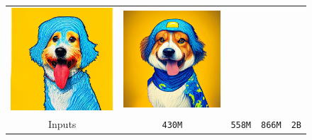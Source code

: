 \begin{figure}[!ht]
\begin{tabular}[t]{c c c c c}
    \includegraphics[width=\xwidth]{cp2/figures/dreambooth/dog/c320_checkpoint_99.png} &
    \includegraphics[width=\xwidth]{cp2/figures/dreambooth/dog/c512_checkpoint_99.png} \\
    Inputs &  \texttt{430M} &  \texttt{558M} &  \texttt{866M} &  \texttt{2B} \\
    

\end{tabular}
\end{figure}
